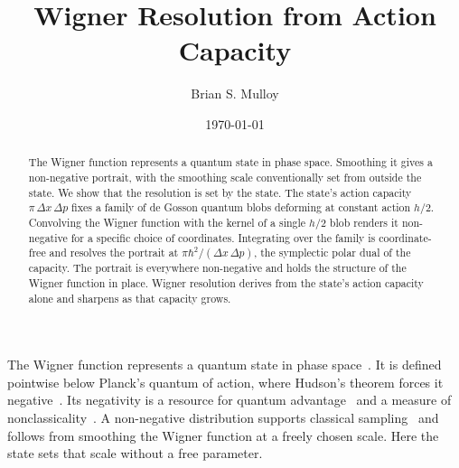 \documentclass[aps,prl,reprint,amsmath,amssymb,floatfix,nofootinbib]{revtex4-2}
\begin{document}
\title{Wigner Resolution from Action Capacity}

\author{Brian S. Mulloy}

\date{\today}

\begin{abstract}
The Wigner function represents a quantum state in phase space. Smoothing it gives a non-negative portrait, with the smoothing scale conventionally set from outside the state. We show that the resolution is set by the state. The state's action capacity $\pi\,\Delta x\,\Delta p$ fixes a family of de Gosson quantum blobs deforming at constant action $h/2$. Convolving the Wigner function with the kernel of a single $h/2$ blob renders it non-negative for a specific choice of coordinates. Integrating over the family is coordinate-free and resolves the portrait at $\pi\hbar^2/(\Delta x\,\Delta p)$, the symplectic polar dual of the capacity. The portrait is everywhere non-negative and holds the structure of the Wigner function in place. Wigner resolution derives from the state's action capacity alone and sharpens as that capacity grows.
\end{abstract}


\maketitle

The Wigner function represents a quantum state in phase space~\cite{wigner1932,hillery1984}. It is defined pointwise below Planck's quantum of action, where Hudson's theorem forces it negative~\cite{hudson1974}. Its negativity is a resource for quantum advantage~\cite{veitch2012,marieisert2012} and a measure of nonclassicality~\cite{kenfack2004}. A non-negative distribution supports classical sampling~\cite{husimi1940,cartwright1976,degosson2005bullsci,dragoman2005phasespace,polkovnikov2010} and follows from smoothing the Wigner function at a freely chosen scale. Here the state sets that scale without a free parameter.
\end{document}
